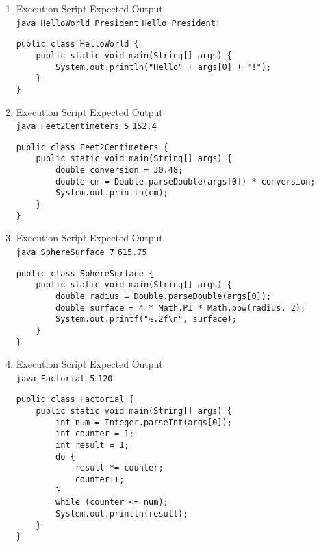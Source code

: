 \documentclass[12pt,letterpaper,twoside]{article}
\begin{document}
\begin{enumerate}[label=\textbf{(\alph*)}]
\item Execution Script \hfill Expected Output\\
\texttt{java HelloWorld President} \hfill \texttt{Hello President!}

\lstset{language=Java,tabsize=4}
\begin{lstlisting}
public class HelloWorld {
	public static void main(String[] args) {
		System.out.println("Hello" + args[0] + "!");
	}
}
\end{lstlisting}

\item Execution Script \hfill Expected Output\\
\texttt{java Feet2Centimeters 5} \hfill \texttt{152.4}

\lstset{language=Java,tabsize=4}
\begin{lstlisting}
public class Feet2Centimeters {
	public static void main(String[] args) {
		double conversion = 30.48;
		double cm = Double.parseDouble(args[0]) * conversion;
		System.out.println(cm);
	}
}
\end{lstlisting}

\item Execution Script \hfill Expected Output\\
\texttt{java SphereSurface 7} \hfill \texttt{615.75}

\lstset{language=Java,tabsize=4}
\begin{lstlisting}
public class SphereSurface {
	public static void main(String[] args) {
		double radius = Double.parseDouble(args[0]);
		double surface = 4 * Math.PI * Math.pow(radius, 2);
		System.out.printf("%.2f\n", surface);
	}
}
\end{lstlisting}

\item Execution Script \hfill Expected Output\\
\texttt{java Factorial 5} \hfill \texttt{120}

\lstset{language=Java,tabsize=4}
\begin{lstlisting}
public class Factorial {
	public static void main(String[] args) {
		int num = Integer.parseInt(args[0]);
		int counter = 1;
		int result = 1;
		do {
			result *= counter;
			counter++;
		}
		while (counter <= num);
		System.out.println(result);
	}
}
\end{lstlisting}

\end{enumerate}
\end{document}
